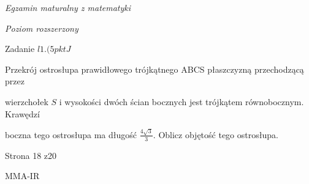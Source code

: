 \documentclass[a4paper,12pt]{article}
\begin{document}
{\it Egzamin maturalny z matematyki}

{\it Poziom rozszerzony}

Zadanie $l1. (5pktJ$

Przekrój ostrosłupa prawidłowego trójkątnego ABCS płaszczyzną przechodzącą przez

wierzchołek $S$ i wysokości dwóch ścian bocznych jest trójkątem równobocznym. Krawędzí

boczna tego ostrosłupa ma długość $\displaystyle \frac{4\sqrt{3}}{3}$. Oblicz objętość tego ostrosłupa.

Strona 18 z20

MMA-IR
\end{document}
